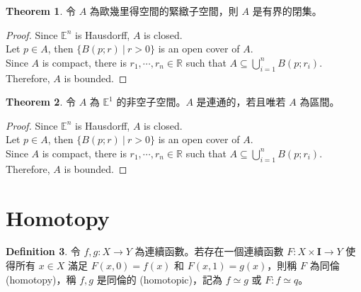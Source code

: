 \documentclass[12pt]{article}
\theoremstyle{definition}
\newtheorem{definition}{Definition}[section]
\newtheorem{theorem}[definition]{Theorem}
\newcommand\<{\langle}
\renewcommand\>{\rangle}
\begin{document}
\begin{CJK}{UTF8}{bsmi}
\begin{theorem}
    令 $A$ 為歐幾里得空間的緊緻子空間，則 $A$ 是有界的閉集。
\end{theorem}
\begin{proof}
    Since $\mathbb{E}^n$ is Hausdorff, $A$ is closed. \\
    Let $p\in A$, then $\{B(p; r)\ |\ r>0\}$ is an open cover of $A$. \\
    Since $A$ is compact, there is $r_1, \cdots, r_n\in\mathbb{R}$ such that $A\subseteq\bigcup_{i=1}^n B(p; r_i)$. \\
    Therefore, $A$ is bounded.
\end{proof}

\begin{theorem}
    令 $A$ 為 $\mathbb{E}^1$ 的非空子空間。$A$ 是連通的，若且唯若 $A$ 為區間。
\end{theorem}
\begin{proof}
    Since $\mathbb{E}^n$ is Hausdorff, $A$ is closed. \\
    Let $p\in A$, then $\{B(p; r)\ |\ r>0\}$ is an open cover of $A$. \\
    Since $A$ is compact, there is $r_1, \cdots, r_n\in\mathbb{R}$ such that $A\subseteq\bigcup_{i=1}^n B(p; r_i)$. \\
    Therefore, $A$ is bounded.
\end{proof}

\section{Homotopy}

\begin{definition}
    令 $f, g:X\to Y$ 為連續函數。若存在一個連續函數 $F:X\times\textbf{I}\to Y$ 使得所有 $x\in X$ 滿足 $F(x, 0)=f(x)$ 和 $F(x, 1)=g(x)$，則稱 $F$ 為同倫 (homotopy)，稱 $f, g$ 是同倫的 (homotopic)，記為 $f\simeq g$ 或 $F:f\simeq q$。
\end{definition}


\end{CJK}
\end{document}
